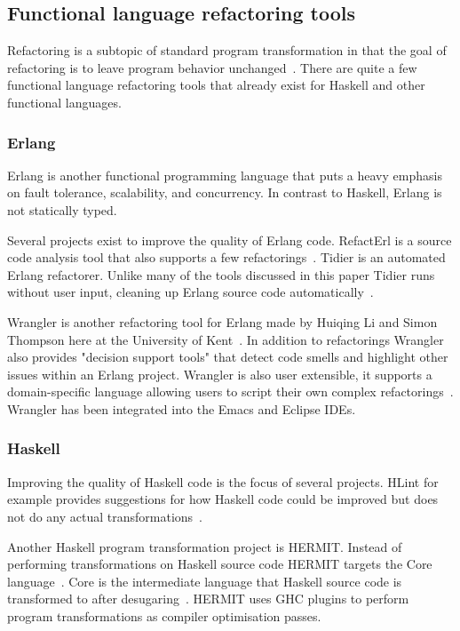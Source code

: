 \subsection{Functional language refactoring tools}

Refactoring is a subtopic of standard program transformation in that the goal of refactoring is to leave program behavior unchanged~\citep{fowler}. There are quite a few functional language refactoring tools that already exist for Haskell and other functional languages. 

\subsubsection{Erlang}

Erlang is another functional programming language that puts a heavy emphasis on fault tolerance, scalability, and concurrency. In contrast to Haskell, Erlang is not statically typed.
 
Several projects exist to improve the quality of Erlang code. RefactErl is a source code analysis tool that also supports a few refactorings~\citep{refactErlWiki}. Tidier is an automated Erlang refactorer. Unlike many of the tools discussed in this paper Tidier runs without user input, cleaning up Erlang source code automatically~\citep{erlangTidier}.

Wrangler is another refactoring tool for Erlang made by Huiqing Li and Simon Thompson here at the University of Kent~\citep{refacTools}. In addition to refactorings Wrangler also provides "decision support tools" that detect code smells and highlight other issues within an Erlang project. Wrangler is also user extensible, it supports a domain-specific language allowing users to script their own complex refactorings~\citep{refacTools}. Wrangler has been integrated into the Emacs and Eclipse IDEs.

\subsubsection{Haskell}

Improving the quality of Haskell code is the focus of several projects. HLint for example provides suggestions for how Haskell code could be improved but does not do any actual transformations~\citep{hlint}.

Another Haskell program transformation project is HERMIT. Instead of performing transformations on Haskell source code HERMIT targets the Core language~\citep{hermit}. Core is the intermediate language that Haskell source code is transformed to after desugaring~\citep{ghcDesign}. HERMIT uses GHC plugins to perform program transformations as compiler optimisation passes. 

